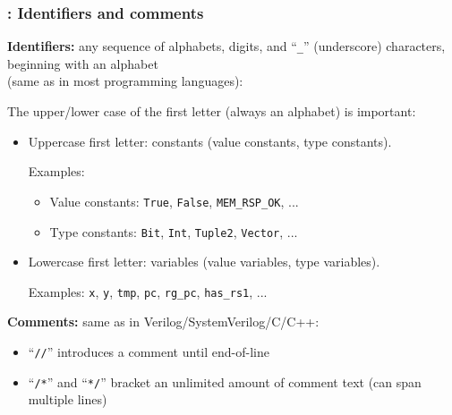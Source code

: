 \begin{frame}[fragile]
\frametitle{{\BSV}: Identifiers and comments}

\footnotesize

{\bf Identifiers:} any sequence of alphabets, digits, and ``\verb|_|''
(underscore) characters, beginning with an alphabet \\
(same as in most programming languages):

\vspace{1ex}

The upper/lower case of the first letter (always an alphabet) is important:
\begin{itemize}
 \item Uppercase first letter: constants (value constants, type constants).

   Examples:
   \begin{itemize}\footnotesize
    \item Value constants: \verb|True|, \verb|False|, \verb|MEM_RSP_OK|, ...
    \item Type constants: \verb|Bit|, \verb|Int|, \verb|Tuple2|, \verb|Vector|, ...
   \end{itemize}

 \vspace{1ex}

 \item Lowercase first letter: variables (value variables, type variables).

       Examples: \verb|x|, \verb|y|, \verb|tmp|, \verb|pc|, \verb|rg_pc|, \verb|has_rs1|, ...

\end{itemize}

\PAUSE{\vspace{10ex}}

{\bf Comments:} same as in Verilog/SystemVerilog/C/C++:
\begin{itemize}
 \item ``\verb|//|'' introduces a comment until end-of-line

 \item ``\verb|/*|'' and ``\verb|*/|'' bracket an unlimited amount of
       comment text (can span multiple lines)
\end{itemize}

\end{frame}


